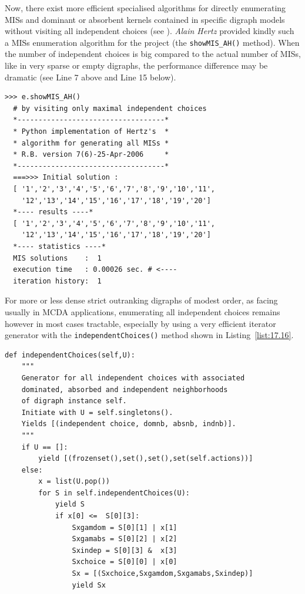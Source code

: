 Now, there exist more efficient specialised algorithms for directly enumerating MISs and dominant or absorbent kernels contained in specific digraph models without visiting all independent choices (see \citealp{BIS-2006b}). \emph{Alain Hertz} provided kindly such a MISs enumeration algorithm for the \Digraph project (the \texttt{showMIS\_AH()} method). When the number of independent choices is big compared to the actual number of MISs, like in very sparse or empty digraphs, the performance difference may be dramatic (see Line 7 above and Line 15 below).
\begin{lstlisting}[caption={Enumerating MISs by visiting only maximal independent choices (\emph{A. Hertz}) },label=list:17.15]
>>> e.showMIS_AH()
  # by visiting only maximal independent choices
  *-----------------------------------*
  * Python implementation of Hertz's  *
  * algorithm for generating all MISs *
  * R.B. version 7(6)-25-Apr-2006     *
  *-----------------------------------*
  ===>>> Initial solution :
  [ '1','2','3','4','5','6','7','8','9','10','11',
    '12','13','14','15','16','17','18','19','20']
  *---- results ----*
  [ '1','2','3','4','5','6','7','8','9','10','11',
    '12','13','14','15','16','17','18','19','20']
  *---- statistics ----*
  MIS solutions    :  1
  execution time   : 0.00026 sec. # <----
  iteration history:  1
\end{lstlisting}

For more or less dense strict outranking digraphs of modest order, as facing usually in MCDA applications, enumerating all independent choices remains however in most cases tractable, especially by using a very efficient iterator generator with the \texttt{independentChoices()} method shown in Listing~\vref{list:17.16}.
\begin{lstlisting}[caption={Generating all independent choices in a digraph},label=list:17.16]
def independentChoices(self,U):
    """
    Generator for all independent choices with associated
    dominated, absorbed and independent neighborhoods
    of digraph instance self.
    Initiate with U = self.singletons().
    Yields [(independent choice, domnb, absnb, indnb)].
    """
    if U == []:
        yield [(frozenset(),set(),set(),set(self.actions))]
    else:
        x = list(U.pop())
        for S in self.independentChoices(U):
            yield S
            if x[0] <=  S[0][3]:
                Sxgamdom = S[0][1] | x[1]
                Sxgamabs = S[0][2] | x[2]
                Sxindep = S[0][3] &  x[3]
                Sxchoice = S[0][0] | x[0]
                Sx = [(Sxchoice,Sxgamdom,Sxgamabs,Sxindep)]
                yield Sx
\end{lstlisting}

